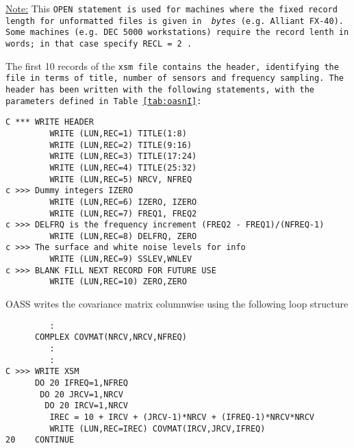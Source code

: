 \noindent \underline{Note:} This \tt OPEN \rm statement is used for machines
where the fixed record length for unformatted files is given in {\em
bytes} (e.g. Alliant FX-40). 
Some machines (e.g. DEC 5000 workstations) require the record lenth
in words; in that case specify \tt RECL = 2 \rm.

The first 10 records of the \tt xsm \rm file contains the header,
identifying the file in terms of title, number of sensors and
frequency sampling. The header has been written with the following
statements, with the parameters defined in Table~\ref{tab:oasnI}:

\small
\begin{verbatim}
C *** WRITE HEADER
         WRITE (LUN,REC=1) TITLE(1:8)
         WRITE (LUN,REC=2) TITLE(9:16)
         WRITE (LUN,REC=3) TITLE(17:24)
         WRITE (LUN,REC=4) TITLE(25:32)
         WRITE (LUN,REC=5) NRCV, NFREQ
c >>> Dummy integers IZERO
         WRITE (LUN,REC=6) IZERO, IZERO
         WRITE (LUN,REC=7) FREQ1, FREQ2
c >>> DELFRQ is the frequency increment (FREQ2 - FREQ1)/(NFREQ-1)
         WRITE (LUN,REC=8) DELFRQ, ZERO
c >>> The surface and white noise levels for info
         WRITE (LUN,REC=9) SSLEV,WNLEV
c >>> BLANK FILL NEXT RECORD FOR FUTURE USE
         WRITE (LUN,REC=10) ZERO,ZERO
\end{verbatim}
\normalsize

OASS writes the covariance matrix columnwise using the following
loop structure  

\small
\begin{verbatim}
         :
      COMPLEX COVMAT(NRCV,NRCV,NFREQ)
         :
         :
C >>> WRITE XSM
      DO 20 IFREQ=1,NFREQ
       DO 20 JRCV=1,NRCV
        DO 20 IRCV=1,NRCV
         IREC = 10 + IRCV + (JRCV-1)*NRCV + (IFREQ-1)*NRCV*NRCV
         WRITE (LUN,REC=IREC) COVMAT(IRCV,JRCV,IFREQ)
20    CONTINUE
\end{verbatim}
\normalsize



